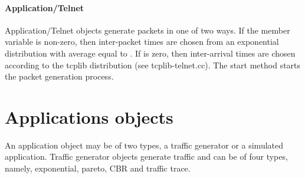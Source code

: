 \paragraph{Application/Telnet} 
Application/Telnet objects generate packets in one of two ways.
If the member variable  is non-zero,
then inter-packet times are chosen
from an exponential distribution with average equal to .
If  is zero, then inter-arrival times are chosen
according to the tcplib distribution (see tcplib-telnet.cc).
The start method starts the packet generation process.

\section{Applications objects} 
\label{sec:appobjects} 
An application object may be of two types, a traffic generator or a
simulated application. Traffic generator objects generate traffic and can
be of four types, namely, exponential, pareto, CBR and traffic trace. 
